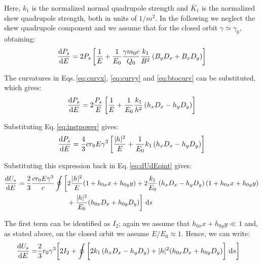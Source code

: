 Here, $k_1$ is the normalized normal quadrupole strength and $\bar{K}_1$ is the normalized skew quadrupole strength, both in units of $1/m^2$. In the following we neglect the skew quadrupole component and we assume that for the closed orbit $\gamma\simeq\gamma_0$, obtaining:
\begin{equation}
    \frac{\text{d} {P_s}}{\text{d} {E}} = 2 P_s \left[ \frac{1}{E} + \frac{1}{E_0} \frac{\gamma m_0 c}{Q_0} \frac{k_1}{B^2} \left( B_y D_x + B_x D_y \right) \right]
\end{equation}

The curvatures in Eqs.\,\eqref{eq:curvx}, \eqref{eq:curvy} and \eqref{eq:btocurv} can be substituted, which gives:
\begin{equation}
    \frac{\text{d} {P_s}}{\text{d} {E}}
    = 2 \frac{P_s}{E} \left[ \frac{1}{E} + \frac{1}{E_0} \frac{k_1}{h^2} \left( h_x D_x - h_y D_y \right) \right]
    \label{eq:dPdE}
\end{equation}

Substituting Eq.\,\eqref{eq:instpower} gives:
\begin{equation}
    \frac{\text{d} {P_s}}{\text{d} {E}}
    = \frac{4}{3} c r_0 E \gamma^3  \left[ \frac{|h|^2}{E} + \frac{1}{E_0} k_1 \left( h_x D_x - h_y D_y \right) \right]
\end{equation}

Substituting this expression back in Eq.\,\eqref{eq:dUdEoint} gives:
\begin{align}
    \frac{\text{d} {U_s}}{\text{d} {E}} = \frac{2}{3} \frac{c r_0 E \gamma^3}{c} \oint \bigg[ &2\frac{|h|^2}{E}(1 + h_{0x}x + h_{0y}y) +
    2\frac{k_1}{E_0} \left( h_x D_x - h_y D_y \right)(1 + h_{0x}x + h_{0y}y) \notag\\ &+ \frac{|h|^2}{E_0} (h_{0x}D_x + h_{0y} D_y)\bigg] \ \text{d} s
\end{align}

The first term can be identified as $I_2$; again we assume that $h_{0x}x + h_{0y}y \ll 1$ and, as stated above, on the closed orbit we assume $E/E_0 \approx 1$. Hence, we can write:
\begin{align}
    \frac{\text{d} {U_s}}{\text{d} {E}} = &\frac{2}{3} r_0 \gamma^3 \bigg[2I_2
    + \oint \bigg[2k_1 \left( h_x D_x - h_y D_y \right) + |h|^2 (h_{0x}D_x + h_{0y} D_y)\bigg] \ \text{d} s \bigg]
\end{align}

